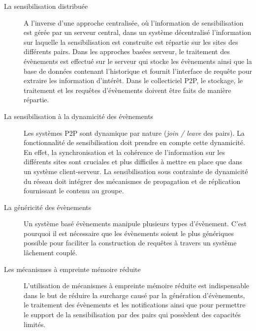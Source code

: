 \begin{description}
	\item[La sensibilisation distribuée] A l'inverse d'une approche centralisée, où 
	l'information de sensibilisation est gérée par un serveur central, dans un 
	système décentralisé l'information sur laquelle la sensibilisation est construite 
	est répartie sur les sites des différents pairs. Dans les approches basées 
	serveur, le traitement des évènements est effectué sur le serveur qui stocke 
	les évènements ainsi que la base de données contenant l'historique et fournit 
	l'interface de requête pour extraire les information d'intérêt. Dans le collecticiel 
	\gls{P2P}, le stockage, le traitement et les requêtes d'évènements doivent être faits 
	de manière répartie.
	
	\item[La sensibilisation à la dynamicité des évènements] Les systèmes \gls{P2P} 
	sont dynamique par nature (\textit{join / leave} des pairs). La fonctionnalité de 
	sensibilisation doit prendre en compte cette dynamicité. En effet, la 
	synchronisation et la cohérence de l'information sur les différents sites sont 
	cruciales et plus difficiles à mettre en place que dans un système 
	client-serveur. La sensibilisation sous contrainte de dynamicité du réseau doit 
	intégrer des mécanismes de propagation et de réplication fournissant le contenu 
	au groupe. 
	
	\item[La généricité des évènements] Un système basé évènements manipule 
	plusieurs types d'évènement. C'est pourquoi il est nécessaire que les 
	évènements soient le plus génériques possible pour faciliter la construction de 
	requêtes à travers un système lâchement couplé.
	
	\item[Les mécanismes à empreinte mémoire réduite] L'utilisation de 
	mécanismes à empreinte mémoire réduite est indispensable dans le but de 
	réduire la surcharge causé par la génération d'évènements, le traitement des 
	évènements et les notifications ainsi que pour permettre le support de la 
	sensibilisation par des pairs qui possèdent des capacités limités.

\end{description}
